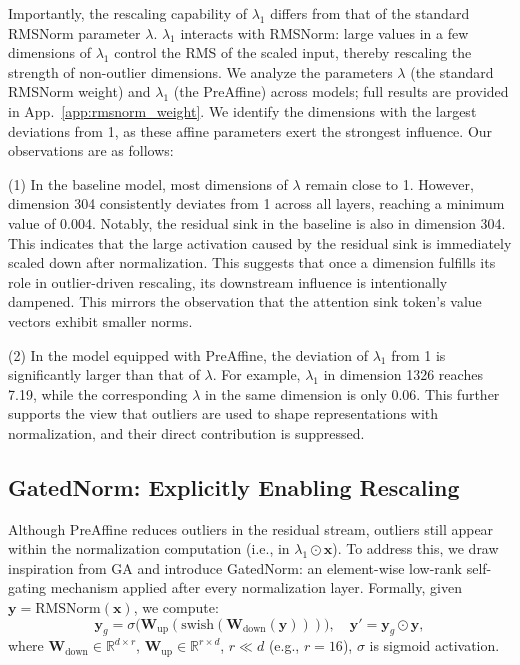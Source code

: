 \documentclass{article} %
\begin{document}
Importantly, the rescaling capability of \(\lambda_1\) differs from that of the standard RMSNorm parameter \(\lambda\). 
\(\lambda_1\) interacts with RMSNorm: large values in a few dimensions of \(\lambda_1\) control the RMS of the scaled input, thereby rescaling the strength of non-outlier dimensions.
We analyze the parameters \(\lambda\) (the standard RMSNorm weight) and \(\lambda_1\) (the PreAffine) across models; full results are provided in App.~\ref{app:rmsnorm_weight}. 
We identify the dimensions with the largest deviations from 1, as these affine parameters exert the strongest influence. Our observations are as follows:

(1) In the baseline model, most dimensions of \(\lambda\) remain close to 1. However, dimension 304 consistently deviates from 1 across all layers, reaching a minimum value of 0.004. 
Notably, the residual sink in the baseline is also in dimension 304. 
This indicates that the large activation caused by the residual sink is immediately scaled down after normalization. 
This suggests that once a dimension fulfills its role in outlier-driven rescaling, its downstream influence is intentionally dampened. 
This mirrors the observation that the attention sink token's value vectors exhibit smaller norms.

(2) In the model equipped with PreAffine, the deviation of \(\lambda_1\) from 1 is significantly larger than that of \(\lambda\). 
For example, \(\lambda_1\) in dimension 1326 reaches 7.19, while the corresponding \(\lambda\) in the same dimension is only 0.06. 
This further supports the view that outliers are used to shape representations with normalization, and their direct contribution is suppressed.

\subsection{GatedNorm: Explicitly Enabling Rescaling}
\label{sec:gate}

Although PreAffine reduces outliers in the residual stream, outliers still appear within the normalization computation (i.e., in \(\lambda_1 \odot \mathbf{x}\)). %
To address this, we draw inspiration from GA and introduce GatedNorm: an element-wise low-rank self-gating mechanism applied after every normalization layer.
Formally, given \(\mathbf{y} = \text{RMSNorm}(\mathbf{x})\), we compute:
\[
\mathbf{y}_g = \sigma\big(\mathbf{W}_{\text{up}}(\text{swish}(\mathbf{W}_{\text{down}}(\mathbf{y})))\big), \quad \mathbf{y}' = \mathbf{y}_g \odot \mathbf{y},
\]
where \(\mathbf{W}_{\text{down}} \in \mathbb{R}^{d \times r}\), \(\mathbf{W}_{\text{up}} \in \mathbb{R}^{r \times d}\), \(r \ll d\) (e.g., \(r = 16\)), \(\sigma\) is sigmoid activation.
\end{document}
